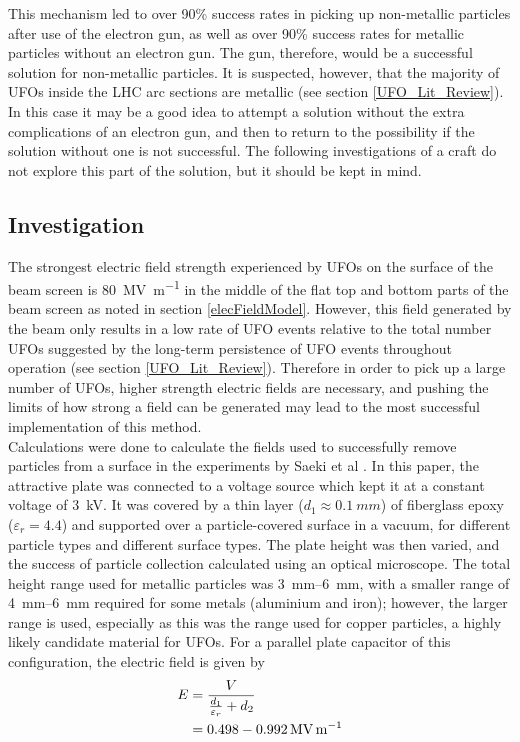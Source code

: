 \documentclass[../main.tex]{subfiles}
\begin{document}
This mechanism led to over 90\% success rates in picking up non-metallic particles after use of the electron gun, as well as over 90\% success rates for metallic particles without an electron gun.
The gun, therefore, would be a successful solution for non-metallic particles.
It is suspected, however, that the majority of UFOs inside the LHC arc sections are metallic (see section \ref{UFO_Lit_Review}).
In this case it may be a good idea to attempt a solution without the extra complications of an electron gun, and then to return to the possibility if the solution without one is not successful.
The following investigations of a craft do not explore this part of the solution, but it should be kept in mind.

\subsection{Investigation}
\label{ssec:ElectrostaticInvestigation}
The strongest electric field strength experienced by UFOs on the surface of the beam screen is \SI{80}{\mega\volt\per\metre} in the middle of the flat top and bottom parts of the beam screen as noted in section \ref{elecFieldModel}.
However, this field generated by the beam only results in a low rate of UFO events relative to the total number UFOs suggested by the long-term persistence of UFO events throughout operation (see section \ref{UFO_Lit_Review}).
Therefore in order to pick up a large number of UFOs, higher strength electric fields are necessary, and pushing the limits of how strong a field can be generated may lead to the most successful implementation of this method.\\

Calculations were done to calculate the fields used to successfully remove particles from a surface in the experiments by Saeki et al \cite{saeki_essc}.
In this paper, the attractive plate was connected to a voltage source which kept it at a constant voltage of \SI{3}{\kilo\volt}.
It was covered by a thin layer ($d_{1} \approx \SI{0.1}{mm}$) of fiberglass epoxy ($\varepsilon_{r} = 4.4$) and supported over a particle-covered surface in a vacuum, for different particle types and different surface types.
The plate height was then varied, and the success of particle collection calculated using an optical microscope.
The total height range used for metallic particles was \SIrange{3}{6}{\milli\metre}, with a smaller range of \SIrange{4}{6}{\milli\metre} required for some metals (aluminium and iron); however, the larger range is used, especially as this was the range used for copper particles, a highly likely candidate material for UFOs.
For a parallel plate capacitor of this configuration, the electric field is given by
\begin{align}
E &= \frac{V}{\frac{d_{1}}{\varepsilon_{r}} + d_{2}}\\
  &= 0.498 \-- \SI{0.992}{\mega\volt\per\metre} \nonumber
\end{align}
\end{document}
